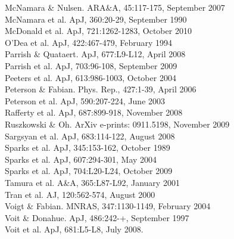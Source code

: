 \documentclass[12pt]{article}
\begin{document}
\noindent [26] McNamara \& Nulsen. ARA\&A, 45:117-175, September 2007\\
\noindent [27] McNamara et al. ApJ, 360:20-29, September 1990\\
\noindent [28] McDonald et al. ApJ, 721:1262-1283, October 2010\\
\noindent [29] O'Dea et al. ApJ, 422:467-479, February 1994\\
\noindent [30] Parrish \& Quataert. ApJ, 677:L9-L12, April 2008\\
\noindent [31] Parrish et al. ApJ, 703:96-108, September 2009\\
\noindent [32] Peeters et al. ApJ, 613:986-1003, October 2004\\
\noindent [33] Peterson \& Fabian. Phys. Rep., 427:1-39, April 2006\\
\noindent [34] Peterson et al. ApJ, 590:207-224, June 2003\\
\noindent [35] Rafferty et al. ApJ, 687:899-918, November 2008\\
\noindent [36] Ruszkowski \& Oh. ArXiv e-prints: 0911.5198, November 2009\\
\noindent [37] Sargsyan et al. ApJ, 683:114-122, August 2008\\
\noindent [38] Sparks et al. ApJ, 345:153-162, October 1989\\
\noindent [39] Sparks et al. ApJ, 607:294-301, May 2004\\
\noindent [40] Sparks et al. ApJ, 704:L20-L24, October 2009\\
\noindent [41] Tamura et al. A\&A, 365:L87-L92, January 2001\\
\noindent [42] Tran et al. AJ, 120:562-574, August 2000\\
\noindent [43] Voigt \& Fabian. MNRAS, 347:1130-1149, February 2004\\
\noindent [44] Voit \& Donahue. ApJ, 486:242-+, September 1997\\
\noindent [45] Voit et al. ApJ, 681:L5-L8, July 2008.
\end{document}
